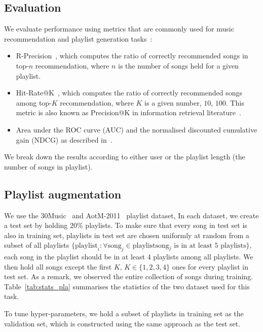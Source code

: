 \subsection{Evaluation}
We evaluate performance using metrics that are commonly used for music recommendation and playlist generation
tasks~\cite{hariri2012context,bonnin2013evaluating,jannach2015beyond,ben2017groove,schedl2017}:
\begin{itemize}
\item R-Precision~\cite{manning2008introIR}, which computes the ratio of correctly recommended songs in top-$n$ recommendation, 
      where $n$ is the number of songs held for a given playlist.
\item Hit-Rate@K~\cite{hariri2012context}, which computes the ratio of correctly recommended songs among top-$K$ recommendation, 
      where $K$ is a given number, \eg $10$, $100$. 
      This metric is also known as Precision@K in information retrieval literature~\cite{manning2008introIR}.
\item Area under the ROC curve (AUC) and the normalised discounted cumulative gain (NDCG) as described in~\cite{agarwal2011infinite}.
\end{itemize}
We break down the results according to either user or the playlist length (\ie the number of songs in playlist).


\subsection{Playlist augmentation}
\label{ssec:pla}

We use the 30Music~\cite{30music2015} and AotM-2011~\cite{mcfee2012hypergraph} playlist dataset,
In each dataset, we create a test set by holding 20\% playlists.
To make sure that every song in test set is also in training set, 
playlists in test set are chosen uniformly at random from a subset of all playlists 
$\{\text{playlist}_i: \forall \text{song}_j \in \text{playlist} \text{song$_j$ is in at least $5$ playlists}\}$,
\ie each song in the playlist should be in at least 4 playlists among all playlists.
We then hold all songs except the first $K, \, K \in \{1,2,3,4\}$ ones for every playlist in test set.
As a remark, we observed the entire collection of songs during training.
Table~\ref{tab:stats_pla} summarises the statistics of the two dataset used for this task.

To tune hyper-parameters, we hold a subset of playlists in training set as the validation set, 
which is constructed using the same approach as the test set.

